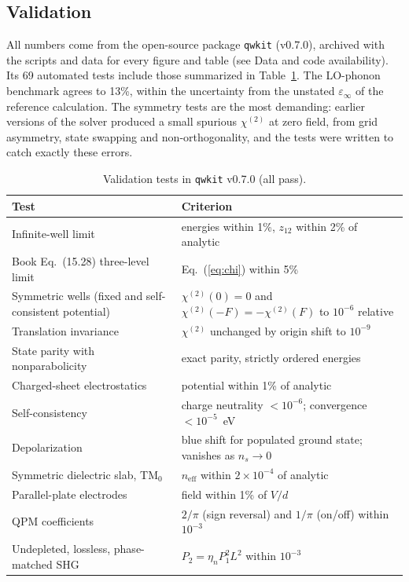 \documentclass[11pt]{article}
\newcommand{\chitwo}{\chi^{(2)}}
\begin{document}
\subsection{Validation}
All numbers come from the open-source package \texttt{qwkit} (v0.7.0), archived with the scripts and data for every figure and table (see Data and code availability). Its 69 automated tests include those summarized in Table~\ref{tab:validation}. The LO-phonon benchmark agrees to 13\%, within the uncertainty from the unstated $\varepsilon_\infty$ of the reference calculation. The symmetry tests are the most demanding: earlier versions of the solver produced a small spurious $\chitwo$ at zero field, from grid asymmetry, state swapping and non-orthogonality, and the tests were written to catch exactly these errors.

\begin{table}[t]
\centering\small
\caption{Validation tests in \texttt{qwkit} v0.7.0 (all pass).}\label{tab:validation}
\begin{tabular}{@{}ll@{}}
\toprule
Test & Criterion \\ \midrule
Infinite-well limit & energies within 1\%, $z_{12}$ within 2\% of analytic \\
Book Eq.~(15.28) three-level limit & Eq.~(\ref{eq:chi}) within 5\% \\
Symmetric wells (fixed and self-consistent potential) & $\chitwo(0)=0$ and $\chitwo(-F)=-\chitwo(F)$ to $10^{-6}$ relative \\
Translation invariance & $\chitwo$ unchanged by origin shift to $10^{-9}$ \\
State parity with nonparabolicity & exact parity, strictly ordered energies \\
Charged-sheet electrostatics & potential within 1\% of analytic \\
Self-consistency & charge neutrality $<10^{-6}$; convergence $<10^{-5}$~eV \\
Depolarization & blue shift for populated ground state; vanishes as $n_s\to0$ \\
Symmetric dielectric slab, TM$_0$ & $n_\mathrm{eff}$ within $2\times10^{-4}$ of analytic \\
Parallel-plate electrodes & field within 1\% of $V/d$ \\
QPM coefficients & $2/\pi$ (sign reversal) and $1/\pi$ (on/off) within $10^{-3}$ \\
Undepleted, lossless, phase-matched SHG & $P_2=\eta_nP_1^2L^2$ within $10^{-3}$ \\

\end{tabular}
\end{table}
\end{document}
